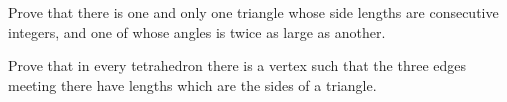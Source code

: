 \item Prove that there is one and only one triangle whose side lengths are consecutive integers, and one of whose angles is twice as large as another.
\item Prove that in every tetrahedron there is a vertex such that the three edges meeting there have lengths which are the sides of a triangle.


